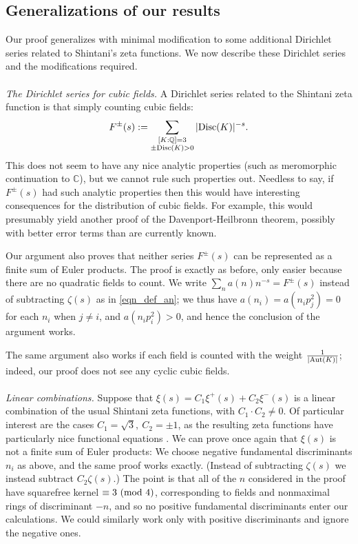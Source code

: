 \documentclass[12pt]{amsart}
\theoremstyle{remark}
\numberwithin{theorem}{section} \numberwithin{equation}{section}
\newcommand{\Aut}{{\text {\rm Aut}}}
\newcommand{\Q}{\mathbb{Q}}
\newcommand{\textmod}{{\text {\rm mod}}}
\newcommand{\Disc}{\textnormal{Disc}}
\begin{document}
\subsection{Generalizations of our results}
Our proof generalizes with minimal modification to some additional Dirichlet series related to Shintani's zeta functions. We now describe these
Dirichlet series and the modifications required.
\\
\\
{\itshape The Dirichlet series for cubic fields.} A Dirichlet series related to the Shintani zeta function is that
simply counting cubic fields:
\begin{equation}
F^{\pm}(s) := \sum_{\substack{[K : \Q] = 3 \\ \pm \Disc(K) > 0}} |\Disc(K)|^{-s}.
\end{equation}
This does not seem to have any nice analytic properties (such as meromorphic continuation to $\mathbb{C}$),
but we cannot rule such properties out. Needless to say, if $F^{\pm}(s)$ had such analytic properties then
this would have interesting consequences for the distribution of cubic fields. For example, this would presumably
yield another proof of the Davenport-Heilbronn theorem, possibly with better error terms than are currently known.

Our argument also proves that neither series $F^{\pm}(s)$ can be represented as a finite sum of Euler
products. The proof is exactly as before, only easier because there are no quadratic fields to count.
We write
$\sum_n a(n) n^{-s} = F^{\pm}(s)$ instead of subtracting $\zeta(s)$ as in \eqref{eqn_def_an}; we thus
have $a(n_i) = a(n_i p_j^2) = 0$ for each $n_i$ when $j \neq i$, and $a(n _i p_i^2) > 0$, and hence the conclusion of the argument works.

The same argument also works if each field is counted with the weight $\frac{1}{|\Aut(K)|}$; indeed, our proof does not
see any cyclic cubic fields.
\\
\\
{\itshape Linear combinations.} Suppose that $\xi(s) = C_1 \xi^+(s) + C_2 \xi^-(s)$ is a linear combination of the usual
Shintani zeta functions, with $C_1 \cdot C_2 \neq 0$. Of particular interest are the cases $C_1 = \sqrt{3}, \ C_2 = \pm 1$,
as the resulting zeta functions have particularly nice functional equations \cite{DW2, N, O}.
We can prove once again that $\xi(s)$ is not a finite sum of Euler products:
We choose negative fundamental discriminants
$n_i$ as above, and the same proof works exactly. (Instead of subtracting $\zeta(s)$ we instead subtract
$C_2 \zeta(s)$.) The point is that all of the $n$ considered in the proof have squarefree kernel $\equiv 3 \ (\textmod \ 4)$,
corresponding to fields and nonmaximal rings of discriminant $-n$, 
and so no positive fundamental discriminants enter our calculations. We could similarly work only with positive discriminants
and ignore the negative ones.
\end{document}
